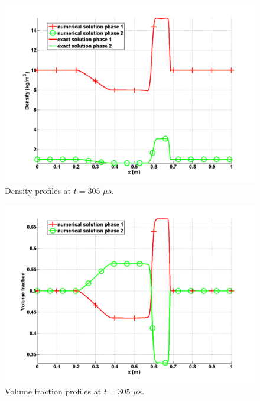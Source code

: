 %
\begin{figure}[H]
\centering
\includegraphics[width=\textwidth]{figures/relaxation_two_phases_density.png}
\caption{Density profiles at $t=305$ $\mu s$.}
\label{fig:two-fluids-rel-rho-7-eqn-sect4}
\end{figure}
%
\begin{figure}[H]
\centering
\includegraphics[width=\textwidth]{figures/relaxation_two_phases_volume_fraction.png}
\caption{Volume fraction profiles at $t=305$ $\mu s$.}
\label{fig:two-fluids-rel-vf-7-eqn-sect4}
\end{figure}
%
